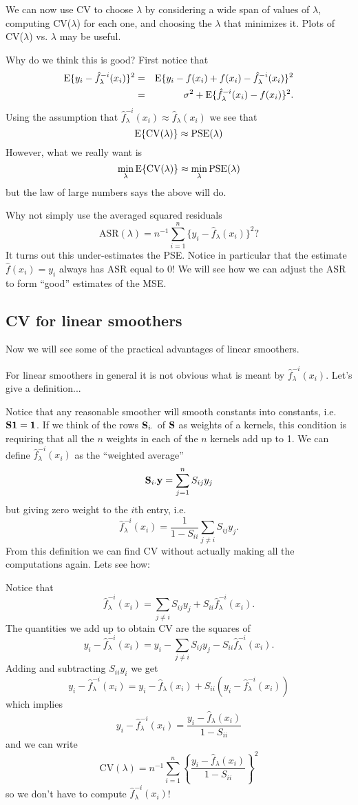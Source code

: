 We can now use CV to choose $\lambda$ by considering a wide span of values
of $\lambda$, computing CV($\lambda$) for each one, and choosing the
$\lambda$ that minimizes it. Plots of CV($\lambda$) vs. $\lambda$ may
be useful. 

Why do we think this is good? First notice that 
\begin{eqnarray*}
\mbox{E}\{y_i  - \hat{f}_{\lambda}^{-i}(x_i) \}^2 &=& \mbox{E} \{ y_i - f(x_i) +
f(x_i) - \hat{f}_{\lambda}^{-i}(x_i) \}^2\\
&=& \sigma^2 + \mbox{E}\{\hat{f}_{\lambda}^{-i}(x_i) - f(x_i)\}^2.
\end{eqnarray*}
Using the assumption that $\hat{f}_{\lambda}^{-i}(x_i) \approx
\hat{f}_{\lambda}(x_i)$ we see that
\[
\mbox{E}\{\mbox{CV}(\lambda)\} \approx \mbox{PSE}(\lambda)
\]
However, what we really want is
\[
\min_{\lambda} \mbox{E}\{\mbox{CV}(\lambda)\} \approx \min_{\lambda} \mbox{PSE}(\lambda)
\]
but the law of large numbers says the above will do.

Why not simply use the averaged squared residuals 
\[
\mbox{ASR}(\lambda)= n^{-1} \sum_{i=1}^n \{y_i - \hat{f}_{\lambda}(x_i)\}^2?
\]
It turns out this under-estimates the PSE. Notice in particular that 
the estimate $\hat{f}(x_i) = y_i$ always has ASR equal to 0! We will
see how we can adjust the ASR to form ``good'' estimates of the MSE. 

\subsection{CV for linear smoothers}
Now we will see some of the practical advantages of linear smoothers. 

For linear smoothers in general it is not obvious what is meant by
$\hat{f}_{\lambda}^{-i}(x_i)$. Let's give a definition...

Notice that any reasonable smoother will smooth constants into
constants, i.e. ${\mathbf S} {\mathbf 1} = {\mathbf 1}$. If we think
of the rows ${\mathbf S}_{i\cdot}$ of ${\mathbf S}$ as weights of a kernels,
this condition is 
requiring that all the $n$ weights in each of the $n$ kernels add up
to 1. We can define 
$\hat{f}_{\lambda}^{-i}(x_i)$ as the ``weighted average'' 
\[
{\mathbf S}_{i\cdot} {\mathbf y} = \sum_{j=1}^n S_{ij} y_j
\]
but giving zero weight to the $i$th entry, i.e.
\[
\hat{f}_{\lambda}^{-i}(x_i) = \frac{1}{1 - S_{ii}}\sum_{j\neq i} S_{ij}
y_j.
\]
From this definition we can find CV without actually making all the
computations again. Lets see how:

Notice that
\[
\hat{f}_{\lambda}^{-i}(x_i) = \sum_{j\neq i} S_{ij} y_j + S_{ii} 
\hat{f}_{\lambda}^{-i}(x_i).
\]
The quantities we add up to obtain CV are the squares of
\[
y_i - \hat{f}_{\lambda}^{-i}(x_i) = y_i -  \sum_{j\neq i} S_{ij} y_j -
S_{ii}  \hat{f}_{\lambda}^{-i}(x_i).
\]
Adding and subtracting $S_{ii} y_i$ we get
\[
y_i - \hat{f}_{\lambda}^{-i}(x_i) = y_i - \hat{f}_{\lambda}(x_i) + S_{ii}
( y_i - \hat{f}_{\lambda}^{-i}(x_i))
\]
which implies
\[
y_i - \hat{f}_{\lambda}^{-i}(x_i) = \frac{ y_i -
  \hat{f}_{\lambda}(x_i)}{1 - S_{ii}}
\]
and we can write
\[
\mbox{CV}(\lambda) = n^{-1} \sum_{i=1}^n  \left\{ \frac{ y_i -
  \hat{f}_{\lambda}(x_i)}{1 - S_{ii}} \right\}^2
\]
so we don't have to compute $\hat{f}_{\lambda}^{-i}(x_i)$!

